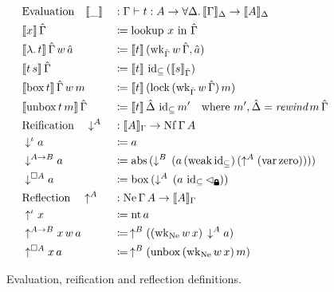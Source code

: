 \documentclass{article}
\newcommand{\lock}{
  \text{\tikz[baseline]{
      \fill[rounded corners=.1ex] (-.75ex,0) rectangle ++(1.5ex,1ex);
      \draw[line width=.3ex] (-.45ex,.5ex) -- ++(0,.75ex) arc (180:0:.45ex) -- ++(0,-.75ex);
}}}
\begin{document}
\begin{figure}
  \centering
  \begin{align*}
    &\text{Evaluation} \quad \llbracket\_\rrbracket &&: \Gamma \vdash t : A \rightarrow \forall\Delta. \, \llbracket\Gamma\rrbracket_\Delta \rightarrow \llbracket A \rrbracket_\Delta \\
    &\llbracket x \rrbracket \, \hat\Gamma &&\coloneqq \text{lookup } x \text{ in } \hat\Gamma \\
    &\llbracket \lambda. \, t \rrbracket \, \hat\Gamma \, w \, \hat a &&\coloneqq \llbracket t \rrbracket \, (\operatorname{wk}_{\hat\Gamma} w \, \hat\Gamma, \hat a) \\
    &\llbracket t \, s \rrbracket \, \hat\Gamma &&\coloneqq \llbracket t \rrbracket \, \operatorname{id}_\subseteq \, (\llbracket s \rrbracket_{\hat\Gamma}) \\
    &\llbracket \operatorname{box} t \rrbracket \, \hat\Gamma \, w \, m &&\coloneqq \llbracket t \rrbracket \, (\operatorname{lock} \, (\operatorname{wk}_{\hat\Gamma} w \, \hat\Gamma) \, m) \\
    &\llbracket \operatorname{unbox} t \, m \rrbracket \, \hat\Gamma &&\coloneqq \llbracket t \rrbracket \, \hat\Delta \, \operatorname{id}_\subseteq m' \quad \text{where } m' , \hat\Delta = \textit{rewind} \, m \, \hat\Gamma \\
    &\text{Reification} \quad \downarrow^A &&: \llbracket A \rrbracket_\Gamma \rightarrow \operatorname{Nf} \Gamma \, A \\
    &\downarrow^\iota a &&\coloneqq a \\
    &\downarrow^{A \rightarrow B} a &&\coloneqq \operatorname{abs} \, (\downarrow^B \, (a \, (\operatorname{weak} \operatorname{id}_\subseteq) \, (\uparrow^A (\operatorname{var} \operatorname{zero})))) \\
    &\downarrow^{\Box A} a &&\coloneqq \operatorname{box} \, (\downarrow^A \, (a \, \operatorname{id}_\subseteq \lhd_\lock)) \\
    &\text{Reflection} \quad \uparrow^A &&: \operatorname{Ne} \Gamma \, A \rightarrow \llbracket A \rrbracket_\Gamma \\
    &\uparrow^\iota x &&\coloneqq \operatorname{nt} a \\
    &\uparrow^{A \rightarrow B} x \, w \, a &&\coloneqq \, \uparrow^B ((\operatorname{wk}_{\operatorname{Ne}} w \, x) \, \downarrow^A a) \\
    &\uparrow^{\Box A} x \, a &&\coloneqq \, \uparrow^B (\operatorname{unbox} \, (\operatorname{wk}_{\operatorname{Ne}} w \, x) \, m)
  \end{align*}
  \caption{Evaluation, reification and reflection definitions. \label{fig:nbe}}
\end{figure}
\end{document}
